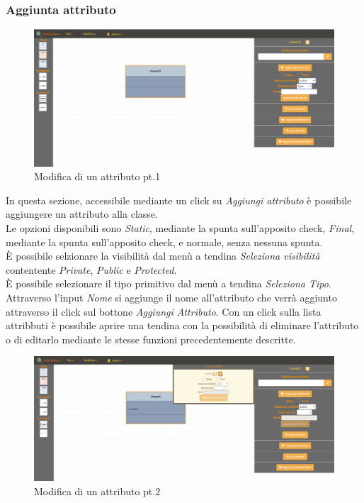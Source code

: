 		\subsubsection{Aggiunta attributo}
			\begin{figure}[h!]
				\centering
					\includegraphics[scale=0.22]{res/img/classe2.png}
				\caption{Modifica di un attributo pt.1}
			\end{figure}
			In questa sezione, accessibile mediante un click su \emph{Aggiungi attributo} è possibile aggiungere un attributo alla classe.\\
			Le opzioni disponibili sono \emph{Static}, mediante la spunta sull'apposito check, \emph{Final}, mediante la spunta sull'apposito check, e normale, senza nessuna spunta.\\
			È possibile selzionare la visibilità dal menù a tendina \emph{Seleziona visibilità} contentente \emph{Private}, \emph{Public} e \emph{Protected}.\\
			È possibile selezionare il tipo primitivo dal menù a tendina \emph{Seleziona Tipo}.\\
			Attraverso l'input \emph{Nome} si aggiunge il nome all'attributo che verrà aggiunto attraverso il click sul bottone \emph{Aggiungi Attributo}.
			Con un click sulla lista attribbuti è possibile aprire una tendina con la possibilità di eliminare l'attributo o di editarlo mediante le stesse funzioni precedentemente descritte.\\
			\begin{figure}[h!]
				\centering
					\includegraphics[scale=0.22]{res/img/classe3.png}
				\caption{Modifica di un attributo pt.2}
			\end{figure}
